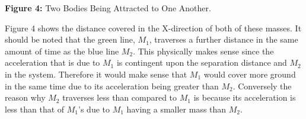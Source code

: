 \documentclass[]{article}
\begin{document}
\begin{multicols}{2}
\begin{center}
\caption{\small{\textbf{Figure 4:}} \tiny{Two Bodies Being Attracted to One Another.}}
\end{center}
Figure 4 shows the distance covered in the X-direction of both of these masses. It should be noted that the green line, $M_1$, traverses a further distance in the same amount of time as the blue line $M_2$. This physically makes sense since the acceleration that is due to $M_1$ is contingent upon the separation distance and $M_2$ in the system. Therefore it would make sense that $M_1$ would cover more ground in the same time due to its acceleration being greater than $M_2$. Conversely the reason why $M_2$ traverses less than compared to $M_1$ is because its acceleration is less than that of $M_1$'s due to $M_1$ having a smaller mass than $M_2$.
\par
\end{multicols}
\newpage
\end{document}

